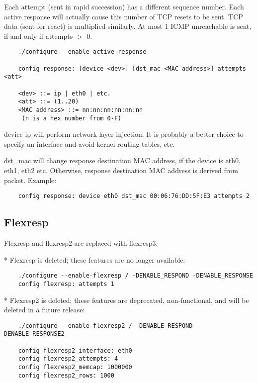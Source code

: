 \documentclass[english]{report}
\begin{document}
Each attempt (sent in rapid succession) has a different sequence number.  Each
active response will actually cause this number of TCP resets to be sent.  TCP
data (sent for react) is multiplied similarly.  At most 1 ICMP unreachable is
sent, if and only if attempts $>$ 0.

\begin{verbatim}
    ./configure --enable-active-response

    config response: [device <dev>] [dst_mac <MAC address>] attempts <att>

    <dev> ::= ip | eth0 | etc.
    <att> ::= (1..20)
    <MAC address> ::= nn:nn:nn:nn:nn:nn    
     (n is a hex number from 0-F)
\end{verbatim}

device ip will perform network layer injection.  It is probably a better choice
to specify an interface and avoid kernel routing tables, etc.

dst\_mac will change response destination MAC address, if the device is eth0, eth1, eth2 etc.
Otherwise, response destination MAC address is derived from packet.
Example:
\begin{verbatim}
    config response: device eth0 dst_mac 00:06:76:DD:5F:E3 attempts 2 
\end{verbatim}

\subsection{Flexresp}
\label{resp section}

Flexresp and flexresp2 are replaced with flexresp3.

* Flexresp is deleted; these features are no longer available:

\begin{verbatim}
    ./configure --enable-flexresp / -DENABLE_RESPOND -DENABLE_RESPONSE
    config flexresp: attempts 1
\end{verbatim}

* Flexresp2 is deleted; these features are deprecated, non-functional, and will
  be deleted in a future release:

\begin{verbatim}
    ./configure --enable-flexresp2 / -DENABLE_RESPOND -DENABLE_RESPONSE2

    config flexresp2_interface: eth0
    config flexresp2_attempts: 4
    config flexresp2_memcap: 1000000
    config flexresp2_rows: 1000
\end{verbatim}
\end{document}
